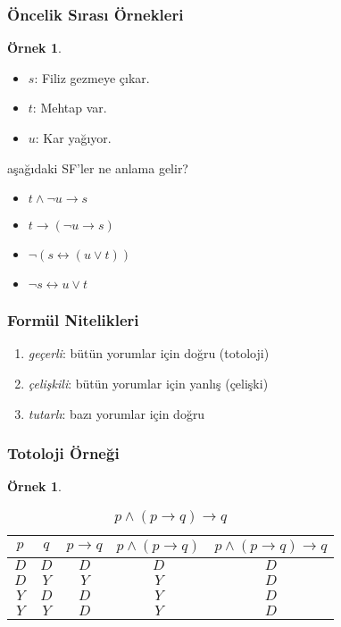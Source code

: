 \documentclass[dvipsnames]{beamer}
\theoremstyle{definition}
\theoremstyle{example}
\newtheorem{ornek}[theorem]{Örnek}
\theoremstyle{plain}
\begin{document}
\begin{frame}
  \frametitle{Öncelik Sırası Örnekleri}

  \begin{ornek}
    \begin{itemize}
      \item $s$: Filiz gezmeye çıkar.
      \item $t$: Mehtap var.
      \item $u$: Kar yağıyor.
    \end{itemize}

    \medskip
    aşağıdaki SF'ler ne anlama gelir?

    \pause
    \begin{itemize}
      \item $t \wedge \neg u \rightarrow s$
      \pause
      \item $t \rightarrow (\neg u \rightarrow s)$
      \pause
      \item $\neg (s \leftrightarrow (u \vee t))$
      \pause
      \item $\neg s \leftrightarrow u \vee t$
    \end{itemize}
  \end{ornek}
\end{frame}

\begin{frame}
  \frametitle{Formül Nitelikleri}

  \begin{enumerate}
    \item \emph{geçerli}: bütün yorumlar için doğru (\alert{totoloji})
    \item \emph{çelişkili}: bütün yorumlar için yanlış (\alert{çelişki})
    \item \emph{tutarlı}: bazı yorumlar için doğru
  \end{enumerate}
\end{frame}

\begin{frame}
  \frametitle{Totoloji Örneği}

  \begin{ornek}
    \begin{table}
      \caption{$p \wedge (p \rightarrow q) \rightarrow q$}
      \begin{tabular}{|c|c|c|c||c|}\hline
        $p$ & $q$ & $p \rightarrow q$ & $p \wedge (p \rightarrow q)$
            & $p \wedge (p \rightarrow q) \rightarrow q$\\\hline\hline
        $D$ & $D$ & $D$ & $D$ & $D$                     \\\hline
        $D$ & $Y$ & $Y$ & $Y$ & $D$                     \\\hline
        $Y$ & $D$ & $D$ & $Y$ & $D$                     \\\hline
        $Y$ & $Y$ & $D$ & $Y$ & $D$                     \\\hline
      \end{tabular}
    \end{table}
  \end{ornek}
\end{frame}
\end{document}
